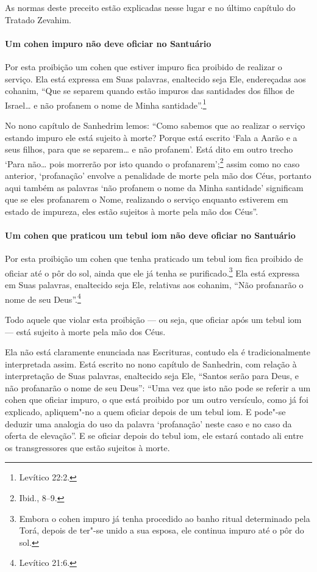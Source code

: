 \begin{multicols}{2}
As normas deste preceito estão explicadas nesse lugar e no último
capítulo do Tratado Zevahim\starr.


\paragraph{Um cohen\starr{} impuro não deve oficiar no Santuário}

Por esta proibição um cohen\starr{} que estiver impuro fica proibido de
realizar o serviço. Ela está expressa em Suas palavras, enaltecido seja
Ele, endereçadas aos cohanim\starr, ``Que se separem quando estão impuros
das santidades dos filhos de Israel\ldots{} e não profanem o nome de Minha
santidade''.\footnote{Levítico 22:2.}

No nono capítulo de Sanhedrim lemos: ``Como sabemos que ao realizar o
serviço estando impuro ele está sujeito à morte? Porque está escrito
`Fala a Aarão e a seus filhos, para que se separem\ldots{} e não profanem'.
Está dito em outro trecho `Para não\ldots{} pois morrerão por isto quando o
profanarem';\footnote{Ibid., 8--9.} assim como no caso anterior, `profanação'
envolve a penalidade de morte pela mão dos Céus, portanto aqui também as
palavras `não profanem o nome da Minha santidade' significam que se eles
profanarem o Nome, realizando o serviço enquanto estiverem em estado de
impureza, eles estão sujeitos à morte pela mão dos Céus''.

\paragraph{Um cohen\starr{} que praticou um tebul iom\starr{} não deve oficiar no
Santuário}

Por esta proibição um cohen\starr{} que tenha praticado um tebul iom\starr{}
fica proibido de oficiar até o pôr do sol, ainda que ele já tenha se
purificado.\footnote{Embora o cohen\starr{} impuro já tenha procedido ao banho ritual
determinado pela Torá\starr, depois de ter"-se unido a sua esposa, ele
continua impuro até o pôr do sol.} Ela está expressa em Suas palavras,
enaltecido seja Ele, relativas aos cohanim\starr, ``Não profanarão o nome
de seu Deus''.\footnote{Levítico 21:6.}

Todo aquele que violar esta proibição --- ou seja, que oficiar após um
tebul iom\starr{} --- está sujeito à morte pela mão dos Céus.

Ela não está claramente enunciada nas Escrituras, contudo ela é
tradicionalmente interpretada assim. Está escrito no nono capítulo de
Sanhedrin\starr, com relação à interpretação de Suas palavras, enaltecido seja
Ele, ``Santos serão para Deus, e não profanarão o nome de seu Deus'': ``Uma vez que isto não
pode se referir a um cohen\starr{} que oficiar impuro, o que está proibido
por um outro versículo, como já foi explicado, apliquem"-no a quem
oficiar depois de um tebul iom\starr. E pode"-se deduzir uma analogia do uso
da palavra `profanação' neste caso e no caso da oferta de elevação''. E
se oficiar depois do tebul iom\starr, ele estará contado ali entre os
transgressores que estão sujeitos à morte.


\end{multicols}
